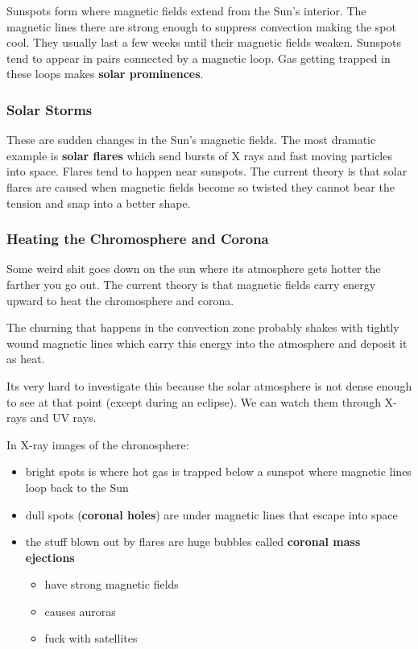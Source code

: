 \documentclass[12pt]{article}
\begin{document}
Sunspots form where magnetic fields extend from the Sun's interior. The magnetic lines there are strong enough to suppress convection making the spot cool. They usually last a few weeks until their magnetic fields weaken. Sunspots tend to appear in pairs connected by a magnetic loop. Gas getting trapped in these loops makes \textbf{solar prominences}.

\subsubsection{Solar Storms}
These are sudden changes in the Sun's magnetic fields. The most dramatic example is \textbf{solar flares} which send bursts of X rays and fast moving particles into space. Flares tend to happen near sunspots. The current theory is that solar flares are caused when magnetic fields become so twisted they cannot bear the tension and snap into a better shape.

\subsubsection{Heating the Chromosphere and Corona}
Some weird shit goes down on the sun where its atmosphere gets hotter the farther you go out. The current theory is that magnetic fields carry energy upward to heat the chromosphere and corona.

The churning that happens in the convection zone probably shakes with tightly wound magnetic lines which carry this energy into the atmosphere and deposit it as heat.

Its very hard to investigate this because the solar atmosphere is not dense enough to see at that point (except during an eclipse). We can watch them through X-rays and UV rays.

In X-ray images of the chronosphere:
\begin{itemize}
    \item bright spots is where hot gas is trapped below a sunspot where magnetic lines loop back to the Sun
    \item dull spots (\textbf{coronal holes}) are under magnetic lines that escape into space
    \item the stuff blown out by flares are huge bubbles called \textbf{coronal mass ejections}
    \begin{itemize}
        \item have strong magnetic fields
        \item causes auroras
        \item fuck with satellites
    \end{itemize}
\end{itemize}
\end{document}
